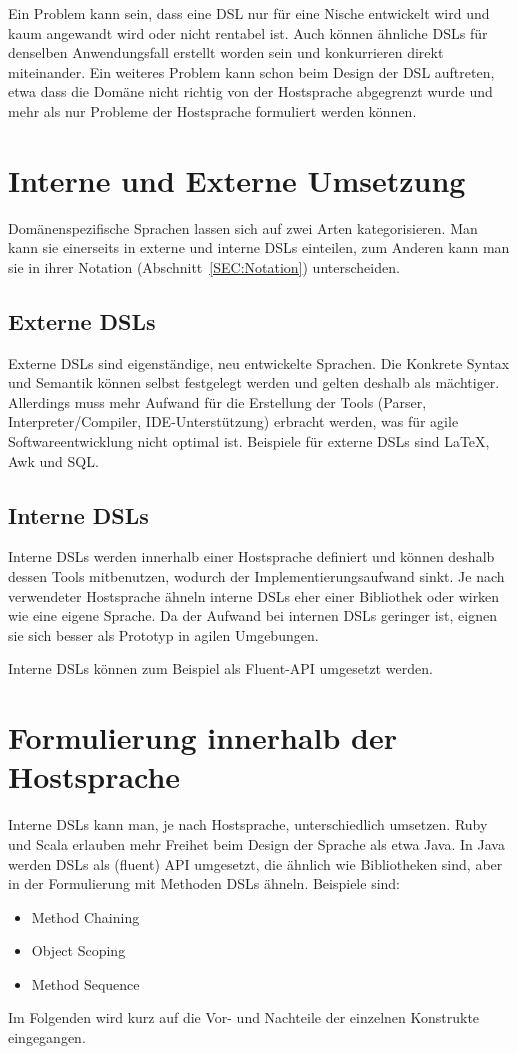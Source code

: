 \documentclass[../InterneDSLs.tex]{subfiles}
\begin{document}
Ein Problem kann sein, dass eine DSL nur für eine Nische entwickelt wird und kaum angewandt wird oder nicht rentabel ist. Auch können ähnliche DSLs für denselben Anwendungsfall erstellt worden sein und konkurrieren direkt miteinander. Ein weiteres Problem kann schon beim Design der DSL auftreten, etwa dass die Domäne nicht richtig von der Hostsprache abgegrenzt wurde und mehr als nur Probleme der Hostsprache formuliert werden können.


\section{Interne und Externe Umsetzung}
Domänenspezifische Sprachen lassen sich auf zwei Arten kategorisieren. Man kann sie einerseits in externe und interne DSLs einteilen, zum Anderen kann man sie in ihrer Notation (Abschnitt~\ref{SEC:Notation}) unterscheiden.

\subsection{Externe DSLs}
Externe DSLs sind eigenständige, neu entwickelte Sprachen. Die Konkrete Syntax und Semantik können selbst festgelegt werden und gelten deshalb als mächtiger. Allerdings muss mehr Aufwand für die Erstellung der Tools (Parser, Interpreter/Compiler, \acs{IDE}-Unterstützung) erbracht werden, was für agile Softwareentwicklung nicht optimal ist. Beispiele für externe DSLs sind LaTeX, Awk und SQL.

\subsection{Interne DSLs}
Interne DSLs werden innerhalb einer Hostsprache definiert und können deshalb dessen Tools mitbenutzen, wodurch der Implementierungsaufwand sinkt. Je nach verwendeter Hostsprache ähneln interne DSLs eher einer Bibliothek oder wirken wie eine eigene Sprache. Da der Aufwand bei internen DSLs geringer ist, eignen sie sich besser als Prototyp in agilen Umgebungen.~\cite{butting2018deriving}

Interne DSLs können zum Beispiel als Fluent-\acs{API} umgesetzt werden.


\section{Formulierung innerhalb der Hostsprache}
Interne DSLs kann man, je nach Hostsprache, unterschiedlich umsetzen. Ruby und Scala erlauben mehr Freihet beim Design der Sprache als etwa Java. In Java werden DSLs als (fluent) API umgesetzt, die ähnlich wie Bibliotheken sind, aber in der Formulierung mit Methoden DSLs ähneln. Beispiele sind:
\begin{itemize}
	\item Method Chaining
	\item Object Scoping
	\item Method Sequence
\end{itemize}
Im Folgenden wird kurz auf die Vor- und Nachteile der einzelnen Konstrukte eingegangen.
\end{document}
